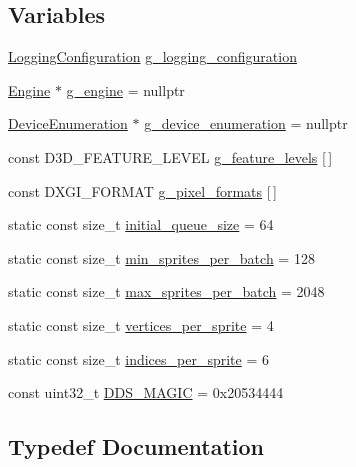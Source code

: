 \subsection*{Variables}
\begin{DoxyCompactItemize}
\item 
\hyperlink{structmage_1_1_logging_configuration}{Logging\+Configuration} \hyperlink{namespacemage_a162413669f92d91c7ee135d60f93fcf1}{g\+\_\+logging\+\_\+configuration}
\item 
\hyperlink{classmage_1_1_engine}{Engine} $\ast$ \hyperlink{namespacemage_a84bf83f1e8779d884452cdf08f56c19a}{g\+\_\+engine} = nullptr
\item 
\hyperlink{classmage_1_1_device_enumeration}{Device\+Enumeration} $\ast$ \hyperlink{namespacemage_a73e54b9b368875ed0281ced59e2fca7e}{g\+\_\+device\+\_\+enumeration} = nullptr
\item 
const D3\+D\+\_\+\+F\+E\+A\+T\+U\+R\+E\+\_\+\+L\+E\+V\+EL \hyperlink{namespacemage_add3b7e051df553262371e077d9d66fd9}{g\+\_\+feature\+\_\+levels} \mbox{[}$\,$\mbox{]}
\item 
const D\+X\+G\+I\+\_\+\+F\+O\+R\+M\+AT \hyperlink{namespacemage_a5a4e11b65061c618b85826ab6df480e0}{g\+\_\+pixel\+\_\+formats} \mbox{[}$\,$\mbox{]}
\item 
static const size\+\_\+t \hyperlink{namespacemage_a64d189167b7098c519fdcefbe4ac058f}{initial\+\_\+queue\+\_\+size} = 64
\item 
static const size\+\_\+t \hyperlink{namespacemage_aecf83c1102c47ecde72f662c43f9722f}{min\+\_\+sprites\+\_\+per\+\_\+batch} = 128
\item 
static const size\+\_\+t \hyperlink{namespacemage_adc9000a9470d1e75475b182bc5c5cde3}{max\+\_\+sprites\+\_\+per\+\_\+batch} = 2048
\item 
static const size\+\_\+t \hyperlink{namespacemage_ad48c52817a0e8892e21bd053cce611ed}{vertices\+\_\+per\+\_\+sprite} = 4
\item 
static const size\+\_\+t \hyperlink{namespacemage_a06594a8c61d05e5884b56efd264cce1e}{indices\+\_\+per\+\_\+sprite} = 6
\item 
const uint32\+\_\+t \hyperlink{namespacemage_a52f784e41b51fee843891c6b5e9be479}{D\+D\+S\+\_\+\+M\+A\+G\+IC} = 0x20534444
\end{DoxyCompactItemize}


\subsection{Typedef Documentation}
\hypertarget{namespacemage_a56eceea5a9bceb2b56073f3ea4945781}{}\label{namespacemage_a56eceea5a9bceb2b56073f3ea4945781} 

